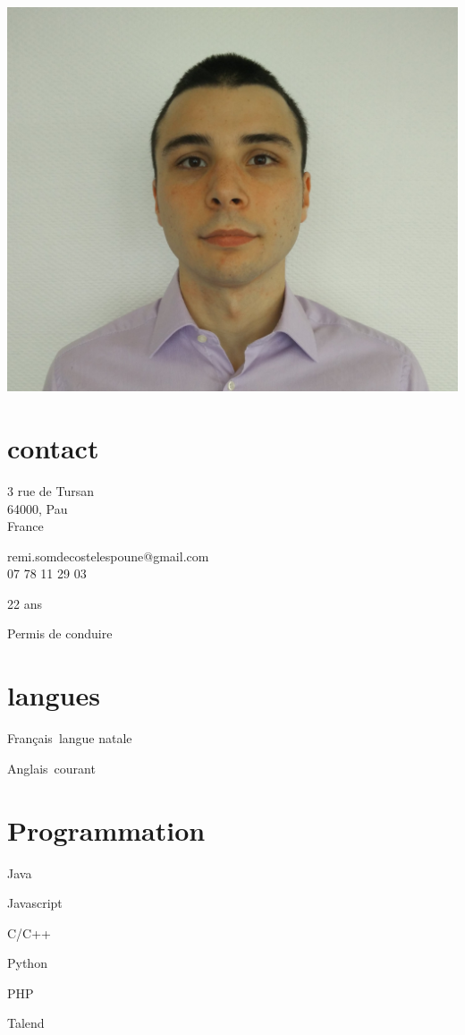 \begin{aside}
%
\includegraphics[width=1\textwidth]{photo.jpg}
\section{contact}
    \item{
        3 rue de Tursan\\
        64000, Pau\\
        France
    }
    \item{
        remi.somdecosteles\-poune@gmail.com\\
        07 78 11 29 03
    }
    \item 22 ans
    \item Permis de conduire

\section{langues}
    \item Français\cdotp~langue natale
    \item Anglais\cdotp~courant

\section{Programmation}
    \item Java
    \item Javascript
    \item C/C++
    \item Python
    \item PHP
    \item Talend
\end{aside}
